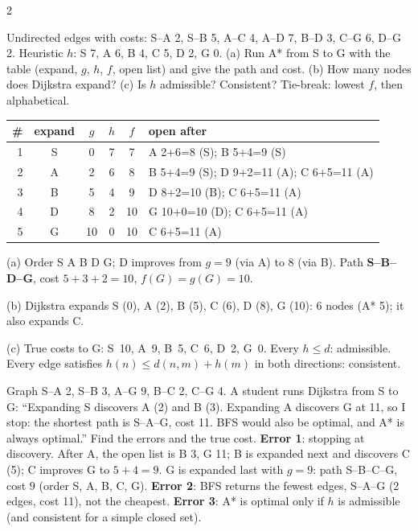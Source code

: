\begin{multicols}{2}
\begin{examq}
Undirected edges with costs: S--A 2, S--B 5, A--C 4, A--D 7, B--D 3, C--G 6, D--G 2. Heuristic $h$: S 7, A 6, B 4, C 5, D 2, G 0. (a) Run A* from S to G with the table (expand, $g$, $h$, $f$, open list) and give the path and cost. (b) How many nodes does Dijkstra expand? (c) Is $h$ admissible? Consistent?
\solution
Tie-break: lowest $f$, then alphabetical.\par\vspace{1pt}
\scriptsize\setlength{\tabcolsep}{2pt}
\begin{tabularx}{\linewidth}{@{}rcccc>{\raggedright\arraybackslash}X@{}}\toprule
\# & expand & $g$ & $h$ & $f$ & open after\\\midrule
1 & S & 0 & 7 & 7 & A 2+6=8 (S); B 5+4=9 (S)\\
2 & A & 2 & 6 & 8 & B 5+4=9 (S); D 9+2=11 (A); C 6+5=11 (A)\\
3 & B & 5 & 4 & 9 & D 8+2=10 (B); C 6+5=11 (A)\\
4 & D & 8 & 2 & 10 & G 10+0=10 (D); C 6+5=11 (A)\\
5 & G & 10 & 0 & 10 & C 6+5=11 (A)\\
\bottomrule\end{tabularx}\par\vspace{2pt}\small
(a) Order S A B D G; D improves from $g=9$ (via A) to $8$ (via B). Path \textbf{S--B--D--G}, cost $5+3+2=\boxed{10}$, $f(G)=g(G)=10$. \par
(b) Dijkstra expands S (0), A (2), B (5), C (6), D (8), G (10): 6 nodes (A* 5); it also expands C. \par
(c) True costs to G: S~10, A~9, B~5, C~6, D~2, G~0. Every $h\le d$: admissible. Every edge satisfies $h(n)\le d(n,m)+h(m)$ in both directions: consistent. \ \chk
\end{examq}
\begin{examq}
Graph S--A 2, S--B 3, A--G 9, B--C 2, C--G 4. A student runs Dijkstra from S to G: ``Expanding S discovers A (2) and B (3). Expanding A discovers G at 11, so I stop: the shortest path is S--A--G, cost 11. BFS would also be optimal, and A* is always optimal.'' Find the errors and the true cost.
\solution
\textbf{Error 1}: stopping at discovery. After A, the open list is B 3, G 11; B is expanded next and discovers C (5); C improves G to $5+4=9$. G is expanded last with $g=9$: path S--B--C--G, cost $\boxed{9}$ (order S, A, B, C, G). \textbf{Error 2}: BFS returns the fewest edges, S--A--G (2 edges, cost 11), not the cheapest. \textbf{Error 3}: A* is optimal only if $h$ is admissible (and consistent for a simple closed set). \chk

\end{examq}
\end{multicols}
